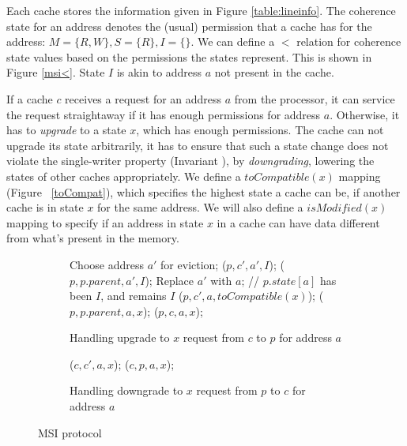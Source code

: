 Each cache stores the information given in Figure \ref{table:lineinfo}. The
coherence state for an address denotes the (usual) permission that a cache has
for the address: $M = \{R, W\}, S = \{R\}, I = \{\}$. We can define a $<$
relation for coherence state values based on the permissions the states
represent. This is shown in Figure \ref{msi<}. State $I$ is akin to address $a$
not present in the cache.

If a cache $c$ receives a request for an address $a$ from the processor, it can
service the request straightaway if it has enough permissions for address $a$.
Otherwise, it has to \emph{upgrade} to a state $x$, which has enough
permissions. The cache can not upgrade its state arbitrarily, it has to ensure
that such a state change does not violate the single-writer property (Invariant
\label{singleWriter}), by \emph{downgrading}, \ie lowering the states of other
caches appropriately. We define a $toCompatible(x)$ mapping (Figure
~\ref{toCompat}), which specifies the highest state a cache can be, if another
cache is in state $x$ for the same address. We will also define a
$isModified(x)$ mapping to specify if an address in state $x$ in a cache can
have data different from what's present in the memory.


\begin{figure}

\begin{subfigure}{\linewidth}
\begin{boxedminipage}{\linewidth}
\begin{algorithmic}
    \State Choose address $a'$ for eviction;
      \State \call{} \dReq($p , c', a', I$);
    \EndFor
    \State \call{} \dResp($p , p.parent, a', I$);
    \State Replace $a'$ with $a$;
    \State // $p.state[a]$ has been $I$, and remains $I$
  \EndIf
    \State \dReq($p , c', a, toCompatible(x)$);
  \EndFor
  \State \uReqL($p , p.parent, a, x$);
  \State \uResp($p , c, a, x$);
\EndProc
\end{algorithmic}
\end{boxedminipage}
\caption{Handling upgrade to $x$ request from $c$ to $p$ for address $a$}
\label{uReq}
\end{subfigure}

\begin{subfigure}{\linewidth}
\begin{boxedminipage}{\linewidth}
\begin{algorithmic}
    \State \dReqL($c , c', a, x$);
  \EndFor
  \State \dResp($c , p, a, x$);
\EndProc
\end{algorithmic}
\end{boxedminipage}
\caption{Handling downgrade to $x$ request from $p$ to $c$ for address $a$}
\label{dReq}
\end{subfigure}

\caption{MSI protocol}
\label{msi}
\end{figure}


